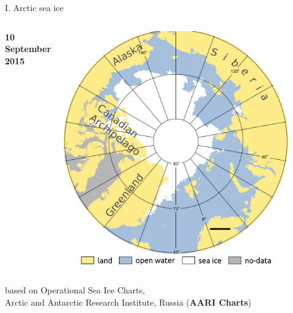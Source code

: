 \documentclass[8pt]{beamer}
\newcommand\Fontvi{\fontsize{6}{7.2}\selectfont}
\begin{document}
\begin{frame}[fragile]{I. Arctic sea ice}
\begin{columns}
		\begin{center}
			\textbf{10 September 2015}
		\end{center}
			\includegraphics[width=0.9\textwidth]{./img/ArcticSI_Sep2015_SI_names.pdf}\\
	\end{columns}
\Fontvi
based on Operational Sea Ice Charts,\\
Arctic and Antarctic Research Institute, Russia (\textbf{AARI Charts})	
\end{frame}
	
\end{document}
